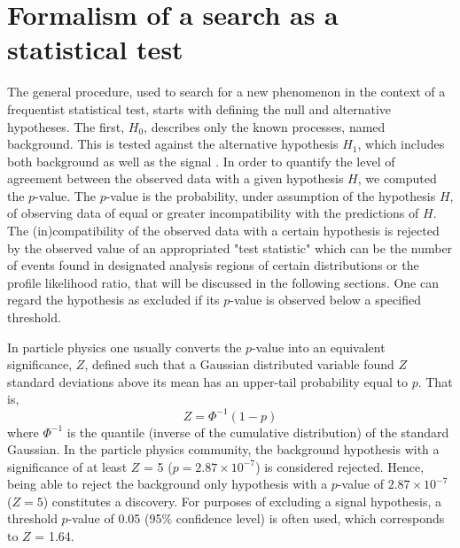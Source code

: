 \documentclass[a4paper, oneside, 11pt, openright]{book}
\begin{document}
		\section{Formalism of a search as a statistical test}
 			The general procedure, used to search for a new phenomenon in the context of a frequentist statistical test, starts with defining the null and alternative hypotheses. The first, $H_0$, describes only the known processes, named background. This is tested against the alternative hypothesis $H_1$, which includes both background as well as the signal \cite{Statistic}. In order to quantify the level of agreement between the observed data with a given hypothesis $H$, we computed the $p$-value. The $p$-value is the probability, under assumption of the hypothesis $H$, of observing data of equal or greater incompatibility with the predictions of $H$. The (in)compatibility of the observed data with a certain hypothesis is rejected by the observed value of an appropriated "test statistic" which can be the number of events found in designated analysis regions of certain distributions or the profile likelihood ratio, that will be discussed in the following sections. One can regard the hypothesis as excluded if its $p$-value is observed below a specified threshold.
 			
 			In particle physics one usually converts the $p$-value into an equivalent significance, $Z$, defined such that a Gaussian distributed variable found $Z$ standard deviations above its mean has an upper-tail probability equal to $p$. That is,
 			\begin{equation}\label{eq:Z}
 				Z = \Phi^{-1}(1-p)
 			\end{equation}
 			where $\Phi^{-1}$ is the quantile (inverse of the cumulative distribution) of the standard Gaussian. In the particle physics community, the background hypothesis with a significance of at least $Z$ = 5 ($p = 2.87\times10^{-7}$) is considered rejected. Hence, being able to reject the background only hypothesis with a $p$-value of $2.87\times10^{-7}$ ($Z=5$) constitutes a discovery. For purposes of excluding a signal hypothesis, a threshold $p$-value of 0.05 (95\% confidence level) is often used, which corresponds to $Z$ = 1.64.
 			
\end{document}
